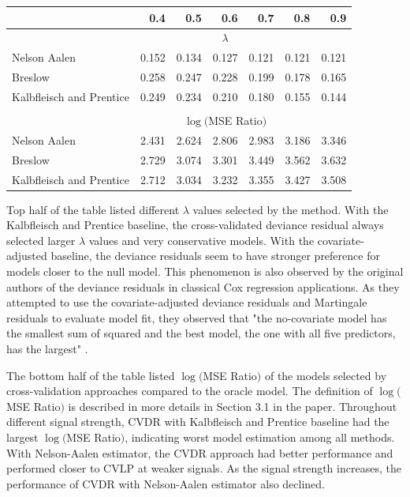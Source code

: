 \documentclass{article}
\begin{document}
\begin{table}[h]
\centering
\begin{tabular}{lrrrrrr}
\toprule
  & 0.4 & 0.5 & 0.6 & 0.7 & 0.8 & 0.9\\
\midrule
\vspace{1mm}
 & \multicolumn{5}{c}{$\lambda$} & \\ 
\vspace{1mm}
Nelson Aalen & 0.152 & 0.134 & 0.127 & 0.121 & 0.121 & 0.121\\
Breslow & 0.258 & 0.247 & 0.228 & 0.199 & 0.178 & 0.165\\
Kalbfleisch and Prentice & 0.249 & 0.234 & 0.210 & 0.180 & 0.155 & 0.144\\
\vspace{0.5mm}\\
 & \multicolumn{5}{c}{$\log($MSE Ratio$)$} & \\ 
\vspace{1mm}
Nelson Aalen & 2.431 & 2.624 & 2.806 & 2.983 & 3.186 & 3.346 \\
Breslow & 2.729 & 3.074 & 3.301 & 3.449 & 3.562 & 3.632 \\
Kalbfleisch and Prentice & 2.712 & 3.034 & 3.232 & 3.355 & 3.427 & 3.508 \\
\bottomrule
\end{tabular}
\end{table}

Top half of the table listed different $\lambda$ values selected by the method. With the Kalbfleisch and Prentice baseline, the cross-validated deviance residual always selected larger $\lambda$ values and very conservative models. With the covariate-adjusted baseline, the deviance residuals seem to have stronger preference for models closer to the null model. This phenomenon is also observed by the original authors of the deviance residuals in classical Cox regression applications. As they attempted to use the covariate-adjusted deviance residuals and Martingale residuals to evaluate model fit, they observed that "the no-covariate model has the smallest sum of squared and the best model, the one with all five predictors, has the largest" \citep{Therneau2000modeling}.

The bottom half of the table listed $\log($MSE Ratio$)$ of the models selected by cross-validation approaches compared to the oracle model. The definition of $\log($MSE Ratio$)$ is described in more details in Section 3.1 in the paper. Throughout different signal strength, CVDR with Kalbfleisch and Prentice baseline had the largest $\log($MSE Ratio$)$, indicating worst model estimation among all methods. With Nelson-Aalen estimator, the CVDR approach had better performance and performed closer to CVLP at weaker signals. As the signal strength increases, the performance of CVDR with Nelson-Aalen estimator also declined.
\end{document}
